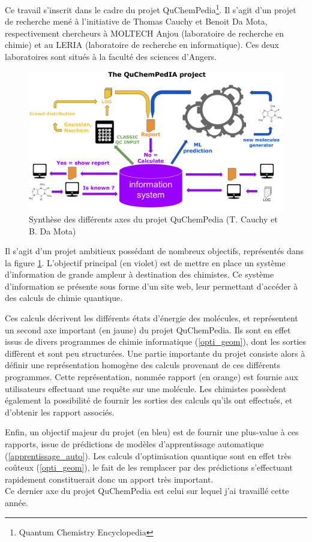 \label{quchempedia}

\par Ce travail s'inscrit dans le cadre du projet QuChemPedia\footnote{Quantum Chemistry Encyclopedia}. Il s'agit d'un projet de recherche mené à l'initiative de Thomas Cauchy et Benoit Da Mota, respectivement chercheurs à MOLTECH Anjou (laboratoire de recherche en chimie) et au LERIA (laboratoire de recherche en informatique). Ces deux laboratoires sont situés à la faculté des sciences d'Angers.\\

\begin{figure}
	\centering
	\includegraphics[scale=1]{images/part_proj.png}
	\caption{Synthèse des différents axes du projet QuChemPedia (T. Cauchy et B. Da Mota)}
	\label{figquchem}
\end{figure}

\par Il s'agit d'un projet ambitieux possédant de nombreux objectifs, représentés dans la figure \ref{figquchem}. L'objectif principal (en violet) est de mettre en place un système d'information de grande ampleur à destination des chimistes. Ce système d'information se présente sous forme d'un site web, leur permettant d'accéder à des calculs de chimie quantique.\par Ces calculs décrivent les différents états d'énergie des molécules, et représentent un second axe important (en jaune) du projet QuChemPedia. Ils sont en effet issus de divers programmes de chimie informatique (\ref{opti_geom}), dont les sorties diffèrent et sont peu structurées. Une partie importante du projet consiste alors à définir une représentation homogène des calculs provenant de ces différents programmes. Cette représentation, nommée rapport (en orange) est fournie aux utilisateurs effectuant une requête sur une molécule. Les chimistes possèdent également la possibilité de fournir les sorties des calculs qu'ils ont effectués, et d'obtenir les rapport associés.
\par Enfin, un objectif majeur du projet (en bleu) est de fournir une plus-value à ces rapports, issue de prédictions de modèles d'apprentissage automatique (\ref{apprentissage_auto}). Les calculs d'optimisation quantique sont en effet très coûteux (\ref{opti_geom}), le fait de les remplacer par des prédictions s'effectuant rapidement constituerait donc un apport très important.\\
Ce dernier axe du projet QuChemPedia est celui sur lequel j'ai travaillé cette année.


